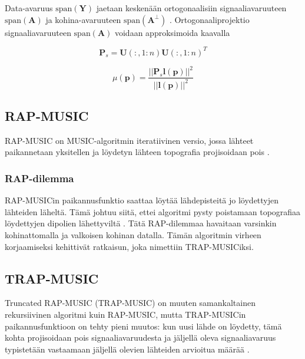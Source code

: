 Data-avaruus $\text{span}(\mathbf{Y})$ jaetaan keskenään ortogonaalisiin signaaliavaruuteen $\text{span}(\mathbf{A})$  ja kohina-avaruuteen $\text{span}(\mathbf{A^\bot})$  \citep{Mosher1999SourceMUSIC}. Ortogonaaliprojektio signaaliavaruuteen $\text{span}(\mathbf{A})$ voidaan approksimoida kaavalla

\begin{equation}
    \textbf{P}_{s}=\textbf{U}(:,1:n)\textbf{U}(:,1:n)^T
\end{equation}

\begin{equation}
    \mu(\mathbf{p}) = \frac{||\mathbf{P}_s\mathbf{l(p)}||^2}{||\mathbf{l(p)}||^2}    
\end{equation}


\subsection{RAP-MUSIC}
RAP-MUSIC on MUSIC-algoritmin iteratiivinen versio, jossa lähteet paikannetaan yksitellen ja löydetyn lähteen topografia projisoidaan pois \citep{Mosher1999SourceMUSIC}. 

\subsubsection{RAP-dilemma}
RAP-MUSICin paikannusfunktio saattaa löytää lähdepisteitä jo löydettyjen lähteiden läheltä. Tämä johtuu siitä, ettei algoritmi pysty poistamaan topografiaa löydettyjen dipolien lähettyviltä \citep{Makela2018TruncatedLocalization}. Tätä RAP-dilemmaa havaitaan varsinkin kohinattomalla ja valkoisen kohinan datalla. Tämän algoritmin virheen korjaamiseksi \cite{Makela2018TruncatedLocalization} kehittivät ratkaisun, joka nimettiin TRAP-MUSICiksi. 

\subsection{TRAP-MUSIC}
Truncated RAP-MUSIC (TRAP-MUSIC) on muuten samankaltainen rekursiivinen algoritmi kuin RAP-MUSIC, mutta TRAP-MUSICin paikannusfunktioon on tehty pieni muutos: kun uusi lähde on löydetty, tämä kohta projisoidaan pois signaaliavaruudesta ja jäljellä oleva signaaliavaruus typistetään vastaamaan jäljellä olevien lähteiden arvioitua määrää \citep{Makela2018TruncatedLocalization}.